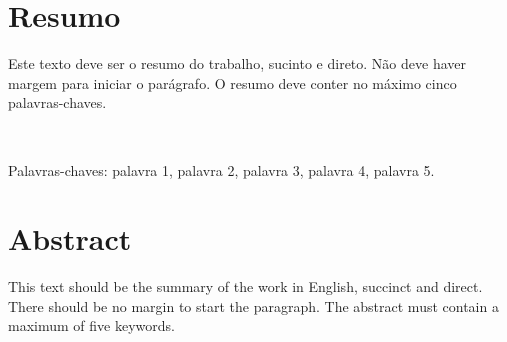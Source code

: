 \documentclass[12pt,oneside]{book} %
\begin{document}





    \chapter*{Resumo}
    \thispagestyle{empty}

    Este texto deve ser o resumo do trabalho, sucinto e direto. Não deve haver margem para iniciar o parágrafo. O resumo deve conter no máximo cinco palavras-chaves.

    \

    \noindent Palavras-chaves: palavra 1, palavra 2, palavra 3, palavra 4, palavra 5.










    \chapter*{Abstract}
    \thispagestyle{empty}

    This text should be the summary of the work in English, succinct and direct. There should be no margin to start the paragraph. The abstract must contain a maximum of five keywords.

    \
\end{document}
